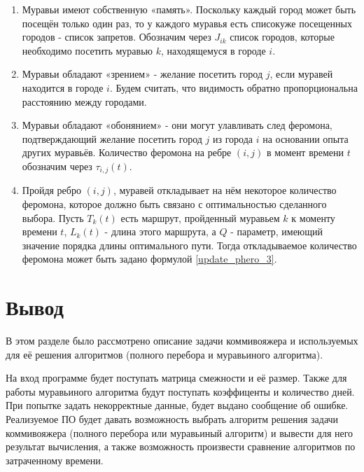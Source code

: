 \begin{enumerate}
	\item  Муравьи имеют собственную «память». Поскольку каждый город может быть посещён только один раз, то у каждого муравья есть списокуже посещенных городов - список запретов. Обозначим через $J_{ik}$ список городов, которые необходимо посетить муравью $k$, находящемуся в городе $i$.
	\item Муравьи обладают «зрением» - желание посетить город $j$, если муравей находится в городе $i$. Будем считать, что видимость обратно пропорциональна расстоянию между городами.
	\item Муравьи обладают «обонянием» - они могут улавливать след феромона, подтверждающий желание посетить город $j$ из города $i$ на основании опыта других муравьёв. Количество феромона на ребре $(i, j)$ в момент времени $t$ обозначим через $\tau_{i,j}(t)$.
	\item Пройдя ребро $(i, j)$, муравей откладывает на нём некоторое количество феромона, которое должно быть связано с оптимальностью сделанного выбора. Пусть $T_{k}(t)$ есть маршрут, пройденный муравьем $k$ к моменту времени $t$, $L_{k}(t)$ - длина этого маршрута, а $Q$ - параметр, имеющий значение порядка длины оптимального пути. Тогда откладываемое количество феромона может быть задано формулой \eqref{update_phero_3}.
\end{enumerate}

\clearpage

\section{Вывод}

В этом разделе было рассмотрено описание задачи коммивояжера и используемых для её решения алгоритмов (полного перебора и муравьиного алгоритма).

 На вход программе будет поступать матрица смежности и её размер. Также для работы муравьиного алгоритма будут поступать коэффиценты и количество дней. При попытке задать некорректные данные, будет выдано сообщение об ошибке. Реализуемое ПО будет давать возможность выбрать алгоритм решения задачи коммивояжера (полного перебора или муравьиный алгоритм) и вывести для него результат вычисления, а также возможность произвести сравнение алгоритмов по затраченному времени.

